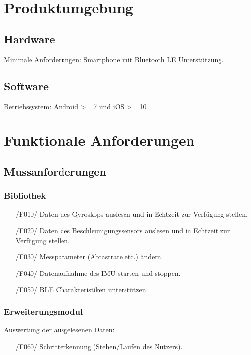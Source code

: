 \documentclass[a4paper,12pt]{article}
\begin{document}
\section{Produktumgebung}
\subsection{Hardware} \textsf{Minimale Anforderungen:} Smartphone mit Bluetooth LE Unterstützung.
\subsection{Software} \textsf{Betriebssystem:} Android >= 7 und iOS >= 10

\section{Funktionale Anforderungen}

  \subsection{Mussanforderungen}
    \subsubsection{Bibliothek}
    \begin{itemize}
      \item[/F010/] Daten des Gyroskops auslesen und in \Gls{Echtzeit} zur Verfügung stellen.
      \item[/F020/] Daten des Beschleunigungssensors auslesen und in Echtzeit zur Verfügung stellen.
      \item[/F030/] Messparameter (Abtastrate etc.) ändern. %
      \item[/F040/] Datenaufnahme des IMU starten und stoppen.
      \item[/F050/] BLE Charakteristiken unterstützen %
    \end{itemize}
    \subsubsection{Erweiterungsmodul}
     Auswertung der ausgelesenen Daten:
     \begin{itemize}
      \item[/F060/] Schritterkennung (Stehen/Laufen des Nutzers).
    \end{itemize}
\end{document}
